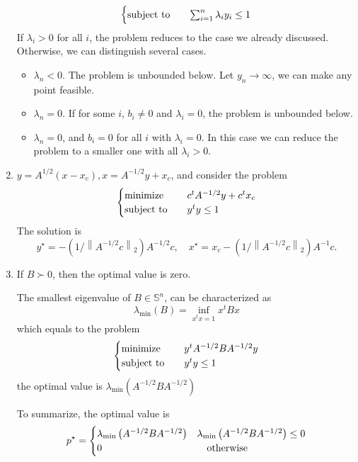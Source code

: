 \begin{problem}[4.21]
\begin{enumerate}
\[\begin{cases}
            \operatorname{subject\ to}\quad &\sum_{i = 1}^n\lambda_iy_i \le 1
        \end{cases}\]If $\lambda_i > 0$ for all $i$, the problem reduces to the case we already discussed. Otherwise, we can distinguish several cases.\begin{itemize}
            \item $\lambda_n < 0$. The problem is unbounded below. Let $y_n \to \infty$, we can make any point feasible.
            \item $\lambda_n = 0$. If for some $i$, $b_i \neq 0$ and $\lambda_i = 0$, the problem is unbounded below.
            \item $\lambda_n = 0$, and $b_i = 0$ for all $i$ with $\lambda_i = 0$. In this case we can reduce the problem to a smaller one with all $\lambda_i > 0$. 
        \end{itemize}
        \item $y = A^{1 / 2}(x - x_c), x = A^{-1 / 2}y + x_c$, and consider the problem\[\begin{cases}
            \operatorname{minimize} \quad &c^tA^{-1 / 2}y + c^tx_c\\
            \operatorname{subject\ to}\quad &y^ty \le 1
        \end{cases}\] The solution is \[y^{\star}=-\left(1 /\left\|A^{-1 / 2} c\right\|_{2}\right) A^{-1 / 2} c, \quad x^{\star}=x_{c}-\left(1 /\left\|A^{-1 / 2} c\right\|_{2}\right) A^{-1} c .\]
        \item If $B \succ 0$, then the optimal value is zero.
        
        The smallest eigenvalue of $B \in \mathbb{S}^n$, can be characterized as\[\lambda_{\min}(B) = \inf_{x^tx = 1}x^tBx\]
        which equals to the problem \[\begin{cases}
            \operatorname{minimize} \quad &y^tA^{-1/2}BA^{-1/2}y\\
            \operatorname{subject\ to} \quad &y^ty \le 1
        \end{cases}\] the optimal value is $\lambda_{\min}(A^{-1/2}BA^{-1/2})$
        
        To summarize, the optimal value is \[p^{\star}=\begin{cases}
            \lambda_{\min }\left(A^{-1 / 2} B A^{-1 / 2}\right) & \lambda_{\min }\left(A^{-1 / 2} B A^{-1 / 2}\right) \leq 0 \\
            0 & \qotherwise 
        \end{cases}\]
    \end{enumerate}
\end{problem}

